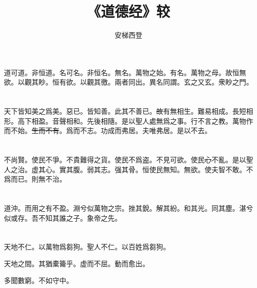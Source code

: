 \documentclass[a5paper]{ctexbook}
\title{《道德经》较}
\author{安梯西登}
\date{}
\newcommand{\he}[1]{\textcolor[RGB]{255,0,255}{#1}}
\newcommand{\bo}[1]{\textcolor[RGB]{0,255,255}{#1}}
\newcommand{\jian}[1]{\textcolor[RGB]{0,255,0}{#1}}
\def\del{\sout}
\begin{document}
    \maketitle

    \tableofcontents

    \chapter{}

    道可道。非\bo{恒}道。名可名。非\bo{恒}名。無名。\bo{萬物}之始。有名。萬物之母。故\bo{恒}無欲。以觀其\bo{眇}。\bo{恒}有欲。以觀其徼。\bo{兩者同出。異名同謂}。玄之又玄。衆\bo{眇}之門。

    \chapter{}

    天下皆知美之爲美。\jian{惡已}。\jian{皆知善。此其不善已}。\jian{\del{故}}有無相生。難易相成。長短相\he{形}。高下相\bo{盈}。音聲相和。\jian{先}後相隨。是以聖人處無爲之事。行不言之教。萬物\jian{作而不始}。\jian{\del{生而不有}}。爲而不\jian{志}。功成而弗居。夫唯弗居。是以不去。

    \chapter{}

    不尚賢。使民不爭。不貴難得之貨。使民不爲盗。不見可欲。使民\bo{\del{心}}不亂。是以聖人之治。虚其心。實其腹。弱其志。强其骨。\bo{恒}使民無知。無欲。\bo{使夫智不敢。不爲而已}。則無不治。

    \chapter{}

    道沖。而用之\bo{有}不盈。淵兮似萬物之宗。挫其銳。解其紛。和其光。同其塵。湛兮似或存。吾不知\bo{其}誰之子。象帝之先。

    \chapter{}

    天地不仁。以萬物爲芻狗。聖人不仁。以百姓爲芻狗。

    天地之間。其猶橐籥乎。虚而不屈。動而愈出。

    多\bo{聞}數窮。不如守中。

    \chapter{}
\end{document}
